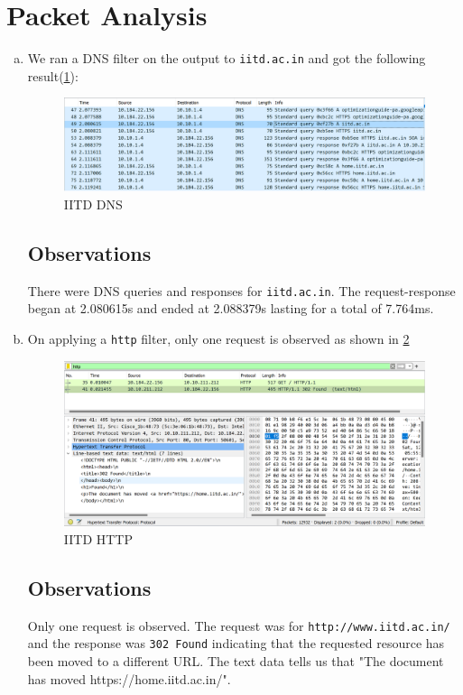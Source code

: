 \documentclass{article}
\begin{document}
\section{Packet Analysis}
\begin{enumerate}[a.]
    \item We ran a DNS filter on the output to {\tt iitd.ac.in} and got the following result(\cref{fig:IITDDNS}):
    \begin{figure}[!ht]
        \centering
        \includegraphics[scale=0.5]{images/IITD dns.png}
        \caption{IITD DNS}
        \label{fig:IITDDNS}
    \end{figure}
    \subsection*{Observations}
    There were DNS queries and responses for {\tt iitd.ac.in}. The request-response began at 2.080615s and ended at 2.088379s lasting for a total of 7.764ms.
    \item On applying a {\tt http} filter, only one request is observed as shown in \cref{fig:IITDHTTP}
    \begin{figure}[!ht]
        \centering
        \includegraphics[scale=0.5]{images/IITD http.png}
        \caption{IITD HTTP}
        \label{fig:IITDHTTP}
    \end{figure}
    \subsection*{Observations}
    Only one request is observed. The request was for {\tt http://www.iitd.ac.in/} and the response was {\tt 302 Found} indicating that the requested resource has been moved to a different URL. The text data tells us that "The document has moved https://home.iitd.ac.in/".


\end{enumerate}
\end{document}
